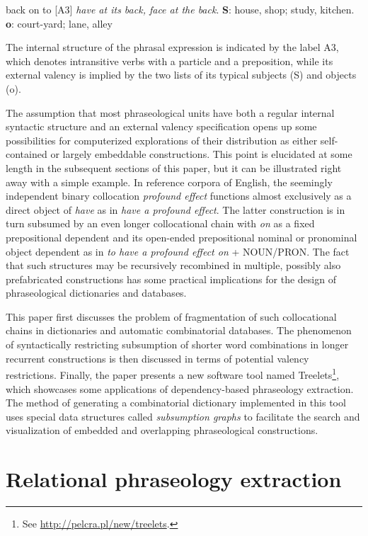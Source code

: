 \documentclass[output=paper]{langscibook}
\begin{document}
\ea
back on to [A3] \textit{have at its back, face at the back}. \textbf{S}: house, shop; study, kitchen. \textbf{o}: court-yard; lane, alley
\z

The internal structure of the phrasal expression is indicated by the label A3, which denotes intransitive verbs with a particle and a preposition, while its external valency is implied by the two lists of its typical subjects (S) and objects (o).

The assumption that most phraseological units have both a regular internal syntactic structure and an external valency specification opens up some possibilities for computerized explorations of their distribution as either self-contained or largely embeddable constructions. This point is elucidated at some length in the subsequent sections of this paper, but it can be illustrated right away with a simple example. In reference corpora of English, the seemingly independent binary collocation \textit{profound effect} functions almost exclusively as a direct object of \textit{have} as in \textit{have a profound effect}. The latter construction is in turn subsumed by an even longer collocational chain with \textit{on} as a fixed prepositional dependent and its open-ended prepositional nominal or pronominal object dependent as in \textit{to have a profound effect on} + NOUN/PRON. The fact that such structures may be recursively recombined in multiple, possibly also prefabricated constructions has some practical implications for the design of phraseological dictionaries and databases. 

This paper first discusses the problem of fragmentation of such collocational chains in dictionaries and automatic combinatorial databases. The phenomenon of syntactically restricting subsumption of shorter word combinations in longer recurrent constructions is then discussed  in terms of potential valency restrictions. Finally, the paper presents a new software tool named Treelets\footnote{See \url{http://pelcra.pl/new/treelets}.}, which showcases some applications of dependency-based phraseology extraction. The method of generating a combinatorial dictionary implemented in this tool uses special data structures called \textit{subsumption graphs} to facilitate the search and visualization of embedded and overlapping phraseological constructions.

\section{Relational phraseology extraction}
\end{document}
